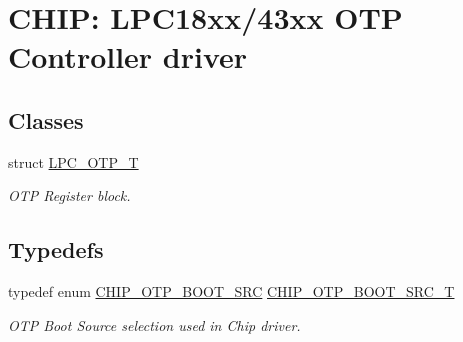 \hypertarget{group___o_t_p__18_x_x__43_x_x}{}\section{C\+H\+IP\+: L\+P\+C18xx/43xx O\+TP Controller driver}
\label{group___o_t_p__18_x_x__43_x_x}
\subsection*{Classes}
\begin{DoxyCompactItemize}
\item 
struct \hyperlink{struct_l_p_c___o_t_p___t}{L\+P\+C\+\_\+\+O\+T\+P\+\_\+T}
\begin{DoxyCompactList}\small\item\em O\+TP Register block. \end{DoxyCompactList}\end{DoxyCompactItemize}
\subsection*{Typedefs}
\begin{DoxyCompactItemize}
\item 
typedef enum \hyperlink{group___o_t_p__18_x_x__43_x_x_ga6e90c3dfad51a2a8591e531b0a788134}{C\+H\+I\+P\+\_\+\+O\+T\+P\+\_\+\+B\+O\+O\+T\+\_\+\+S\+RC} \hyperlink{group___o_t_p__18_x_x__43_x_x_gada36d39d34c8821f0416a852faa926f6}{C\+H\+I\+P\+\_\+\+O\+T\+P\+\_\+\+B\+O\+O\+T\+\_\+\+S\+R\+C\+\_\+T}
\begin{DoxyCompactList}\small\item\em O\+TP Boot Source selection used in Chip driver. \end{DoxyCompactList}\end{DoxyCompactItemize}
